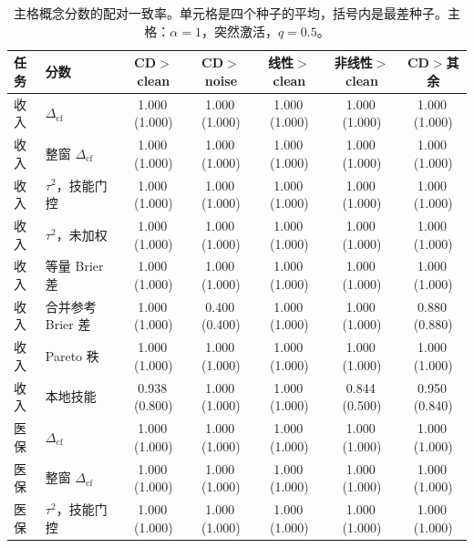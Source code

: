 \documentclass[11pt,a4paper,fontset=none]{ctexart}
\newcommand{\Dcf}{\ensuremath{\Delta_{\mathrm{cf}}}}
\newcommand{\meanmin}[2]{#1\,{\scriptsize(#2)}}
\begin{document}
\begin{landscape}
\begin{table}[p]
\centering
\caption{主格概念分数的配对一致率。单元格是四个种子的平均，括号内是最差种子。主格：\(\alpha=1\)，突然激活，\(q=0.5\)。}
\label{tab:concord-concept}
\footnotesize
\begin{tabular}{@{}llccccc@{}}
\toprule
任务 & 分数 & CD\(>\)clean & CD\(>\)noise & 线性\(>\)clean & 非线性\(>\)clean & CD\(>\)其余 \\
\midrule
收入 & \(\Dcf\) & \meanmin{1.000}{1.000} & \meanmin{1.000}{1.000} & \meanmin{1.000}{1.000} & \meanmin{1.000}{1.000} & \meanmin{1.000}{1.000} \\
收入 & 整窗 \(\Dcf\) & \meanmin{1.000}{1.000} & \meanmin{1.000}{1.000} & \meanmin{1.000}{1.000} & \meanmin{1.000}{1.000} & \meanmin{1.000}{1.000} \\
收入 & \(\tau^{2}\)，技能门控 & \meanmin{1.000}{1.000} & \meanmin{1.000}{1.000} & \meanmin{1.000}{1.000} & \meanmin{1.000}{1.000} & \meanmin{1.000}{1.000} \\
收入 & \(\tau^{2}\)，未加权 & \meanmin{1.000}{1.000} & \meanmin{1.000}{1.000} & \meanmin{1.000}{1.000} & \meanmin{1.000}{1.000} & \meanmin{1.000}{1.000} \\
收入 & 等量 Brier 差 & \meanmin{1.000}{1.000} & \meanmin{1.000}{1.000} & \meanmin{1.000}{1.000} & \meanmin{1.000}{1.000} & \meanmin{1.000}{1.000} \\
收入 & 合并参考 Brier 差 & \meanmin{1.000}{1.000} & \meanmin{0.400}{0.400} & \meanmin{1.000}{1.000} & \meanmin{1.000}{1.000} & \meanmin{0.880}{0.880} \\
收入 & Pareto 秩 & \meanmin{1.000}{1.000} & \meanmin{1.000}{1.000} & \meanmin{1.000}{1.000} & \meanmin{1.000}{1.000} & \meanmin{1.000}{1.000} \\
收入 & 本地技能 & \meanmin{0.938}{0.800} & \meanmin{1.000}{1.000} & \meanmin{1.000}{1.000} & \meanmin{0.844}{0.500} & \meanmin{0.950}{0.840} \\
\midrule
医保 & \(\Dcf\) & \meanmin{1.000}{1.000} & \meanmin{1.000}{1.000} & \meanmin{1.000}{1.000} & \meanmin{1.000}{1.000} & \meanmin{1.000}{1.000} \\
医保 & 整窗 \(\Dcf\) & \meanmin{1.000}{1.000} & \meanmin{1.000}{1.000} & \meanmin{1.000}{1.000} & \meanmin{1.000}{1.000} & \meanmin{1.000}{1.000} \\
医保 & \(\tau^{2}\)，技能门控 & \meanmin{1.000}{1.000} & \meanmin{1.000}{1.000} & \meanmin{1.000}{1.000} & \meanmin{1.000}{1.000} & \meanmin{1.000}{1.000} \\

\end{tabular}
\end{table}
\end{landscape}
\end{document}
